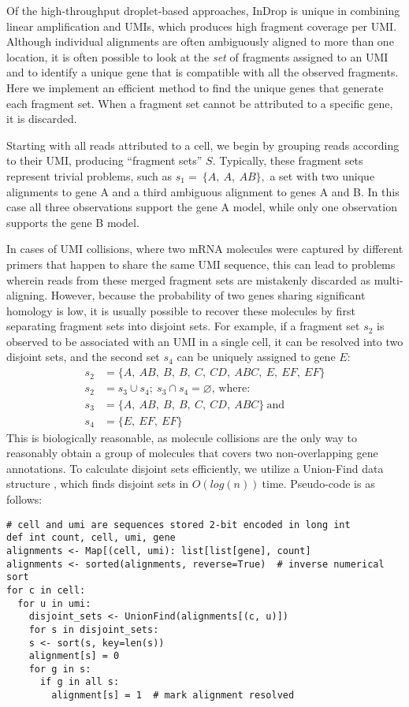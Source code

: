 Of the high-throughput droplet-based approaches, InDrop is unique in combining linear amplification and UMIs, which produces high fragment coverage per UMI\@. 
Although individual alignments are often ambiguously aligned to more than one location, it is often possible to look at the \textit{set} of fragments assigned to an UMI and to identify a unique gene that is compatible with all the observed fragments. 
Here we implement an efficient method to find the unique genes that generate each fragment set. 
When a fragment set cannot be attributed to a specific gene, it is discarded.

Starting with all reads attributed to a cell, we begin by grouping reads according to their UMI, producing ``fragment sets'' \(S\). 
Typically, these fragment sets represent trivial problems, such as \(s_{1} = \ \{ A,\ A,\ AB\},\) a set with two unique alignments to gene A and a third ambiguous alignment to genes A and B. 
In this case all three observations support the gene A model, while only one observation supports the gene B model.

In cases of UMI collisions, where two mRNA molecules were captured by different primers that happen to share the same UMI sequence, this can lead to problems wherein reads from these merged fragment sets are mistakenly discarded as multi-aligning. 
However, because the probability of two genes sharing significant homology is low, it is usually possible to recover these molecules by first separating fragment sets into disjoint sets. 
For example, if a fragment set $s_2$ is observed to be associated with an UMI in a single cell, it can be resolved into two disjoint sets, and the second set $s_4$ can be uniquely assigned to gene $E$: 
\begin{align*}
  s_{2} & = \{ A,\ AB,\ B,\ B,\ C,\ CD,\ ABC,\ E,\ EF,\ EF\} \\
  s_{2} & = s_{3} \cup s_{4};\ s_{3} \cap s_{4} = \varnothing \text{, where}: \\
  s_{3} & = \{ A,\ AB,\ B,\ B,\ C,\ CD,\ ABC\}\ \text{and} \\ 
  s_{4} & = \{ E,\ EF,\ EF\}
\end{align*}
This is biologically reasonable, as molecule collisions are the only way to reasonably obtain a group of molecules that covers two non-overlapping gene annotations.
To calculate disjoint sets efficiently, we utilize a Union-Find data structure \citep{Aho1983}, which finds disjoint sets in \(O(log(n))\ \)time. 
Pseudo-code is as follows:

\begin{verbatim}
# cell and umi are sequences stored 2-bit encoded in long int
def int count, cell, umi, gene
alignments <- Map[(cell, umi): list[list[gene], count]
alignments <- sorted(alignments, reverse=True)  # inverse numerical sort
for c in cell:
  for u in umi:
    disjoint_sets <- UnionFind(alignments[(c, u)])
    for s in disjoint_sets:
    s <- sort(s, key=len(s))
    alignment[s] = 0
    for g in s:
      if g in all s:
        alignment[s] = 1  # mark alignment resolved
\end{verbatim}

